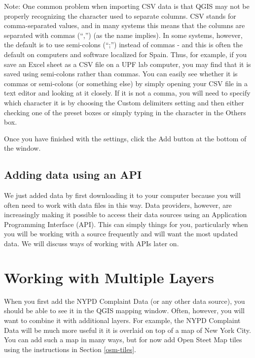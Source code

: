\documentclass[]{book}
\begin{document}
Note: One common problem when importing CSV data is that QGIS may not be properly recognizing the character used to separate columns. CSV stands for comma-separated values, and in many systems this means that the columns are separated with commas (``,'') (as the name implies). In some systems, however, the default is to use semi-colons (``;'') instead of commas - and this is often the default on computers and software localized for Spain. Thus, for example, if you save an Excel sheet as a CSV file on a UPF lab computer, you may find that it is saved using semi-colons rather than commas. You can easily see whether it is commas or semi-colons (or something else) by simply opening your CSV file in a text editor and looking at it closely. If it is not a comma, you will need to specify which character it is by choosing the Custom delimiters setting and then either checking one of the preset boxes or simply typing in the character in the Others box.

Once you have finished with the settings, click the Add button at the bottom of the window.

\hypertarget{adding-data-using-an-api}{%
\subsection{Adding data using an API}\label{adding-data-using-an-api}}

We just added data by first downloading it to your computer because you will often need to work with data files in this way. Data providers, however, are increasingly making it possible to access their data sources using an Application Programming Interface (API). This can simply things for you, particularly when you will be working with a source frequently and will want the most updated data. We will discuss ways of working with APIs later on.

\hypertarget{working-with-multiple-layers}{%
\section{Working with Multiple Layers}\label{working-with-multiple-layers}}

When you first add the NYPD Complaint Data (or any other data source), you should be able to see it in the QGIS mapping window. Often, however, you will want to combine it with additional layers. For example, the NYPD Complaint Data will be much more useful it it is overlaid on top of a map of New York City. You can add such a map in many ways, but for now add Open Steet Map tiles using the instructions in Section \ref{osm-tiles}.
\end{document}
